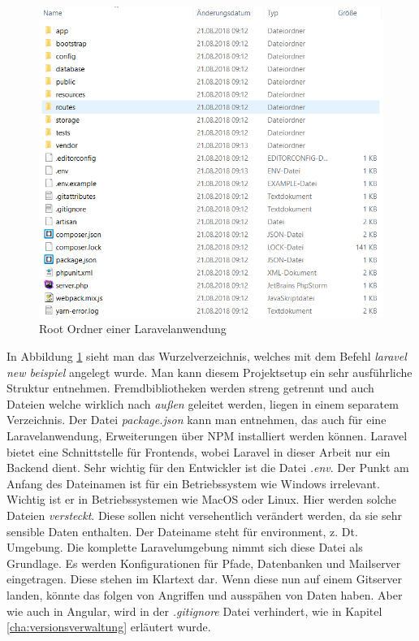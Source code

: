 \begin{figure}[H]
	\centering
	\includegraphics[scale=0.9]{content/pictures/laravelfolder.png}
	\caption{Root Ordner einer Laravelanwendung}
	\label{fig:laravelfolder}
\end{figure}

In Abbildung \ref{fig:laravelfolder} sieht man das Wurzelverzeichnis, welches mit dem Befehl \textit{laravel new beispiel} angelegt wurde. Man kann diesem Projektsetup ein sehr ausführliche Struktur entnehmen. Fremdbibliotheken werden streng getrennt und auch Dateien welche wirklich nach \textit{außen} geleitet werden, liegen in einem separatem Verzeichnis. Der Datei \textit{package.json} kann man entnehmen, das auch für eine Laravelanwendung, Erweiterungen über \ac{NPM} installiert werden können. Laravel bietet eine Schnittstelle für Frontends, wobei Laravel in dieser Arbeit nur ein Backend dient. Sehr wichtig für den Entwickler ist die Datei \textit{.env}. Der Punkt am Anfang des Dateinamen ist für ein Betriebssystem wie Windows irrelevant. Wichtig ist er in Betriebssystemen wie MacOS oder Linux. Hier werden solche Dateien \textit{versteckt}. Diese sollen nicht versehentlich verändert werden, da sie sehr sensible Daten enthalten. Der Dateiname steht für environment, \ac{z. Dt.} Umgebung. Die komplette Laravelumgebung nimmt sich diese Datei als Grundlage. Es werden Konfigurationen für Pfade, Datenbanken und Mailserver eingetragen. Diese stehen im Klartext dar. \autocite{Laravel.2018} Wenn diese nun auf einem Gitserver landen, könnte das folgen von Angriffen und ausspähen von Daten haben. Aber wie auch in Angular, wird in der \textit{.gitignore} Datei verhindert, wie in Kapitel \ref{cha:versionsverwaltung} erläutert wurde.


